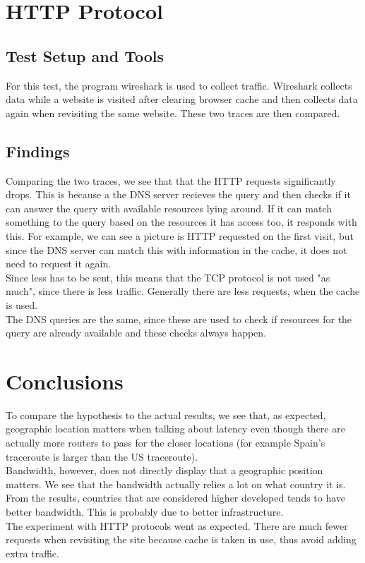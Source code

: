 \documentclass{acm_proc_article-sp}
\begin{document}
\section{HTTP Protocol}
\subsection{Test Setup and Tools}\label{7}
For this test, the program wireshark is used to collect traffic. Wireshark collects data while a website is visited after clearing browser cache and then collects data again when revisiting the same website. These two traces are then compared.

\subsection{Findings}
Comparing the two traces, we see that that the HTTP requests significantly drops. This is because a the DNS server recieves the query and then checks if it can answer the query with available resources lying around. If it can match something to the query based on the resources it has access too, it responds with this. For example, we can see a picture is HTTP requested on the first visit, but since the DNS server can match this with information in the cache, it does not need to request it again.\\
Since less has to be sent, this means that the TCP protocol is not used "as much", since there is less traffic. Generally there are less requests, when the cache is used.\\
The DNS queries are the same, since these are used to check if resources for the query are already available and these checks always happen.


\section{Conclusions}
To compare the hypothesis to the actual results, we see that, as expected, geographic location matters when talking about latency even though there are actually more routers to pass for the closer locations (for example Spain's traceroute is larger than the US traceroute).\\
Bandwidth, however, does not directly display that a geographic position matters. We see that the bandwidth actually relies a lot on what country it is. From the results, countries that are considered higher developed tends to have better bandwidth. This is probably due to better infrastructure.\\
The experiment with HTTP protocols went as expected. There are much fewer requests when revisiting the site because cache is taken in use, thus avoid adding extra traffic.
\end{document}
